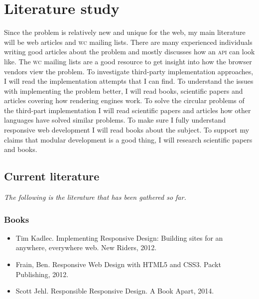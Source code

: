 \documentclass[oneside,a4paper,11pt]{kth-mag}
\begin{document}
\section{Literature study}
Since the problem is relatively new and unique for the web, my main literature will be web articles and \textsc{w}\textsc{c} mailing lists. There are many experienced individuals writing good articles about the problem and mostly discusses how an \textsc{api} can look like. The \textsc{w}\textsc{c} mailing lists are a good resource to get insight into how the browser vendors view the problem. To investigate third-party implementation approaches, I will read the implementation attempts that I can find. To understand the issues with implementing the problem better, I will read books, scientific papers and articles covering how rendering engines work. To solve the circular problems of the third-part implementation I will read scientific papers and articles how other languages have solved similar problems. To make sure I fully understand responsive web development I will read books about the subject. To support my claims that modular development is a good thing, I will research scientific papers and books.

\subsection{Current literature}
\emph{The following is the literature that has been gathered so far.}
\subsubsection{Books}
\begin{itemize}
\item Tim Kadlec. Implementing Responsive Design: Building sites for an anywhere, everywhere web. New Riders, 2012.
\item Frain, Ben. Responsive Web Design with HTML5 and CSS3. Packt Publishing, 2012.
\item Scott Jehl. Responsible Responsive Design. A Book Apart, 2014.
\end{itemize}
\end{document}
